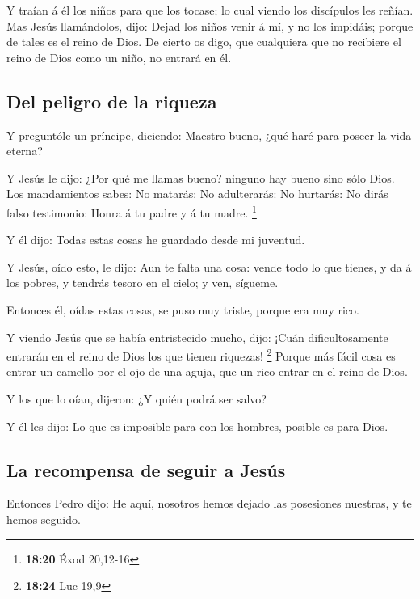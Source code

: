  Y traían á él los niños para que los tocase; lo cual
viendo los discípulos les reñían.  Mas Jesús llamándolos,
dijo: Dejad los niños venir á mí, y no los impidáis; porque de tales es
el reino de Dios.  De cierto os digo, que cualquiera que
no recibiere el reino de Dios como un niño, no entrará en él.

\hypertarget{del-peligro-de-la-riqueza}{%
\subsection{Del peligro de la riqueza}\label{del-peligro-de-la-riqueza}}

 Y preguntóle un príncipe, diciendo: Maestro bueno, ¿qué
haré para poseer la vida eterna?

 Y Jesús le dijo: ¿Por qué me llamas bueno? ninguno hay
bueno sino sólo Dios.  Los mandamientos sabes: No
matarás: No adulterarás: No hurtarás: No dirás falso testimonio: Honra á
tu padre y á tu madre. \footnote{\textbf{18:20} Éxod 20,12-16}

 Y él dijo: Todas estas cosas he guardado desde mi
juventud.

 Y Jesús, oído esto, le dijo: Aun te falta una cosa:
vende todo lo que tienes, y da á los pobres, y tendrás tesoro en el
cielo; y ven, sígueme.

 Entonces él, oídas estas cosas, se puso muy triste,
porque era muy rico.

 Y viendo Jesús que se había entristecido mucho, dijo:
¡Cuán dificultosamente entrarán en el reino de Dios los que tienen
riquezas! \footnote{\textbf{18:24} Luc 19,9}  Porque más
fácil cosa es entrar un camello por el ojo de una aguja, que un rico
entrar en el reino de Dios.

 Y los que lo oían, dijeron: ¿Y quién podrá ser salvo?

 Y él les dijo: Lo que es imposible para con los hombres,
posible es para Dios.

\hypertarget{la-recompensa-de-seguir-a-jesuxfas}{%
\subsection{La recompensa de seguir a
Jesús}\label{la-recompensa-de-seguir-a-jesuxfas}}

 Entonces Pedro dijo: He aquí, nosotros hemos dejado las
posesiones nuestras, y te hemos seguido.

